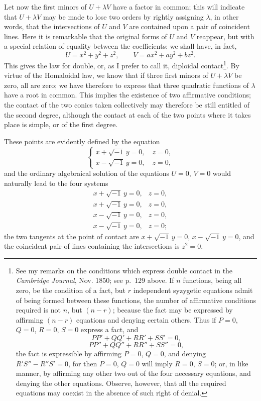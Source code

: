 \documentclass[11pt]{article}
\begin{document}
{{Let now the first minors of $U+\lambda V$ have a factor in common; this will indicate that $U+\lambda V$ may be made to lose two orders by rightly assigning $\lambda$, in other words, that the intersections of $U$ and $V$ are contained upon a pair of coincident lines. Here it is remarkable that the original forms of $U$ and $V$ reappear, but with a special relation of equality between the coefficients: we shall have, in fact,
\[
U=x^2+y^2+z^2,
\qquad
V=ax^2+ay^2+bz^2.
\]
This gives the law for double, or, as I prefer to call it, diploidal contact\footnote{See my remarks on the conditions which express double contact in the \emph{Cambridge Journal}, Nov. 1850; see p.~129 above. If $n$ functions, being all zero, be the condition of a fact, but $r$ independent syzygetic equations admit of being formed between these functions, the number of affirmative conditions required is not $n$, but $(n-r)$; because the fact may be expressed by affirming $(n-r)$ equations and denying certain others. Thus if $P=0$, $Q=0$, $R=0$, $S=0$ express a fact, and
\[
PP'+QQ'+RR'+SS'=0,
\]
\[
PP''+QQ''+RR''+SS''=0,
\]
the fact is expressible by affirming $P=0$, $Q=0$, and denying $R'S''-R''S'=0$, for then $P=0$, $Q=0$ will imply $R=0$, $S=0$; or, in like manner, by affirming any other two out of the four necessary equations, and denying the other equations. Observe, however, that all the required equations may coexist in the absence of such right of denial.}.
By virtue of the Homaloidal law, we know that if three first minors of $U+\lambda V$ be zero, all are zero; we have therefore to express that three quadratic functions of $\lambda$ have a root in common. This implies the existence of two affirmative conditions; the contact of the two conics taken collectively may therefore be still entitled of the second degree, although the contact at each of the two points where it takes place is simple, or of the first degree.

These points are evidently defined by the equation
\[
\begin{cases}
x+\sqrt{-1}\,y=0,\quad z=0,\\
x-\sqrt{-1}\,y=0,\quad z=0,
\end{cases}
\]
and the ordinary algebraical solution of the equations $U=0$, $V=0$ would naturally lead to the four systems
\[
\begin{array}{cc}
x+\sqrt{-1}\,y=0,&z=0,\\
x+\sqrt{-1}\,y=0,&z=0,\\
x-\sqrt{-1}\,y=0,&z=0,\\
x-\sqrt{-1}\,y=0,&z=0;
\end{array}
\]
the two tangents at the point of contact are $x+\sqrt{-1}\,y=0$, $x-\sqrt{-1}\,y=0$, and the coincident pair of lines containing the intersections is $z^2=0$.

}}
\end{document}
